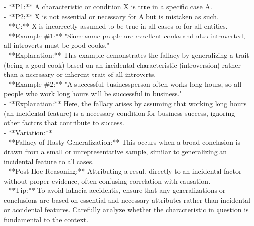 \documentclass[a4paper,12pt,single,pdftex]{scrartcl}
\begin{document}
    
        - **P1:** A characteristic or condition X is true in a specific case A.
    \\

    
        - **P2:** X is not essential or necessary for A but is mistaken as such.
    \\

    
        - **C:** X is incorrectly assumed to be true in all cases or for all entities.
    \\

    
      - **Example \#1:** "Since some people are excellent cooks and also introverted, all introverts must be good cooks."
    \\

    
      - **Explanation:** This example demonstrates the fallacy by generalizing a trait (being a good cook) based on an incidental characteristic (introversion) rather than a necessary or inherent trait of all introverts.
    \\

    
      - **Example \#2:** "A successful businessperson often works long hours, so all people who work long hours will be successful in business."
    \\

    
      - **Explanation:** Here, the fallacy arises by assuming that working long hours (an incidental feature) is a necessary condition for business success, ignoring other factors that contribute to success.
    \\

    
      - **Variation:**
    \\

    
        - **Fallacy of Hasty Generalization:** This occurs when a broad conclusion is drawn from a small or unrepresentative sample, similar to generalizing an incidental feature to all cases.
    \\

    
        - **Post Hoc Reasoning:** Attributing a result directly to an incidental factor without proper evidence, often confusing correlation with causation.
    \\

    
      - **Tip:** To avoid fallacia accidentis, ensure that any generalizations or conclusions are based on essential and necessary attributes rather than incidental or accidental features. Carefully analyze whether the characteristic in question is fundamental to the context.
    \\
\end{document}

